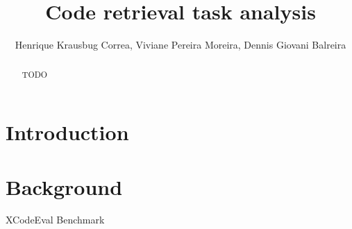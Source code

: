 \documentclass[12pt]{article}
\title{Code retrieval task analysis}
\author{Henrique Krausbug Correa\inst{1}, Viviane Pereira Moreira\inst{1}, Dennis Giovani Balreira\inst{1}}
\begin{document}
 

\maketitle


\begin{abstract}
  TODO
\end{abstract}
     

\section{Introduction}




\section{Background}





XCodeEval Benchmark
\end{document}
